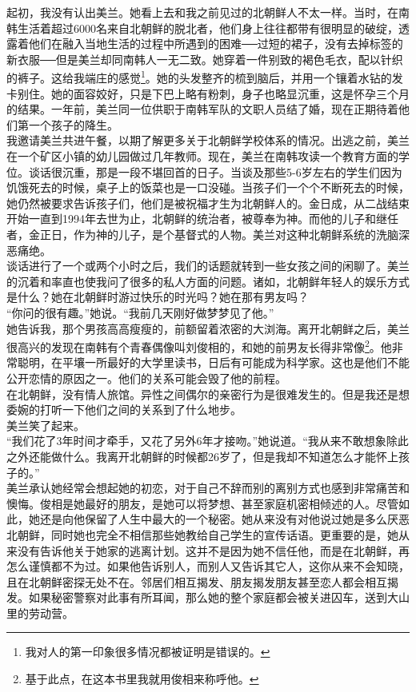 起初，我没有认出美兰。她看上去和我之前见过的北朝鲜人不太一样。当时，在南韩生活着超过6000名来自北朝鲜的脱北者，他们身上往往都带有很明显的破绽，透露着他们在融入当地生活的过程中所遇到的困难──过短的裙子，没有去掉标签的新衣服──但是美兰却同南韩人一无二致。她穿着一件别致的褐色毛衣，配以针织的裤子。这给我端庄的感觉\footnote{我对人的第一印象很多情况都被证明是错误的。}。她的头发整齐的梳到脑后，并用一个镶着水钻的发卡别住。她的面容姣好，只是下巴上略有粉刺，身子也略显沉重，这是怀孕三个月的结果。一年前，美兰同一位供职于南韩军队的文职人员结了婚，现在正期待着他们第一个孩子的降生。\\

我邀请美兰共进午餐，以期了解更多关于北朝鲜学校体系的情况。出逃之前，美兰在一个矿区小镇的幼儿园做过几年教师。现在，美兰在南韩攻读一个教育方面的学位。谈话很沉重，那是一段不堪回首的日子。当谈及那些5-6岁左右的学生们因为饥饿死去的时候，桌子上的饭菜也是一口没碰。当孩子们一个个不断死去的时候，她仍然被要求告诉孩子们，他们是被祝福才生为北朝鲜人的。金日成，从二战结束开始一直到1994年去世为止，北朝鲜的统治者，被尊奉为神。而他的儿子和继任者，金正日，作为神的儿子，是个基督式的人物。美兰对这种北朝鲜系统的洗脑深恶痛绝。\\

谈话进行了一个或两个小时之后，我们的话题就转到一些女孩之间的闲聊了。美兰的沉着和率直也使我问了很多的私人方面的问题。诸如，北朝鲜年轻人的娱乐方式是什么？她在北朝鲜时游过快乐的时光吗？她在那有男友吗？\\

“你问的很有趣。”她说。“我前几天刚好做梦梦见了他。”\\

她告诉我，那个男孩高高瘦瘦的，前额留着浓密的大浏海。离开北朝鲜之后，美兰很高兴的发现在南韩有个青春偶像叫刘俊相的，和她的前男友长得非常像\footnote{基于此点，在这本书里我就用俊相来称呼他。}。他非常聪明，在平壤一所最好的大学里读书，日后有可能成为科学家。这也是他们不能公开恋情的原因之一。他们的关系可能会毁了他的前程。\\

在北朝鲜，没有情人旅馆。异性之间偶尔的亲密行为是很难发生的。但是我还是想委婉的打听一下他们之间的关系到了什么地步。\\

美兰笑了起来。\\

“我们花了3年时间才牵手，又花了另外6年才接吻。”她说道。“我从来不敢想象除此之外还能做什么。我离开北朝鲜的时候都26岁了，但是我却不知道怎么才能怀上孩子的。”\\

美兰承认她经常会想起她的初恋，对于自己不辞而别的离别方式也感到非常痛苦和懊悔。俊相是她最好的朋友，是她可以将梦想、甚至家庭机密相倾述的人。尽管如此，她还是向他保留了人生中最大的一个秘密。她从来没有对他说过她是多么厌恶北朝鲜，同时她也完全不相信那些她教给自己学生的宣传话语。更重要的是，她从来没有告诉他关于她家的逃离计划。这并不是因为她不信任他，而是在北朝鲜，再怎么谨慎都不为过。如果他告诉别人，而别人又告诉其它人，这你从来不会知晓，且在北朝鲜密探无处不在。邻居们相互揭发、朋友揭发朋友甚至恋人都会相互揭发。如果秘密警察对此事有所耳闻，那么她的整个家庭都会被关进囚车，送到大山里的劳动营。\\

